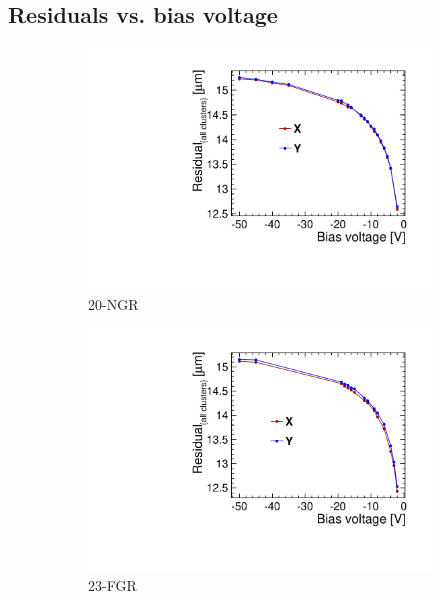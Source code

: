 \subsection{Residuals vs. bias voltage}
\begin{figure}[htbp] \centering
  \begin{subfigure}[b]{0.33\textwidth}
    \includegraphics[width=\textwidth]{./figures/TestBeam/W19_G7_Residual_vs_bias.pdf}
    \caption{20-NGR}
  \end{subfigure} \hfill
  \begin{subfigure}[b]{0.33\textwidth}
    \includegraphics[width=\textwidth]{./figures/TestBeam/W19_F7_Residual_vs_bias.pdf}
    \caption{23-FGR}
  \end{subfigure}\hfill
  \begin{subfigure}[b]{0.33\textwidth}

\end{subfigure}
\end{figure}
